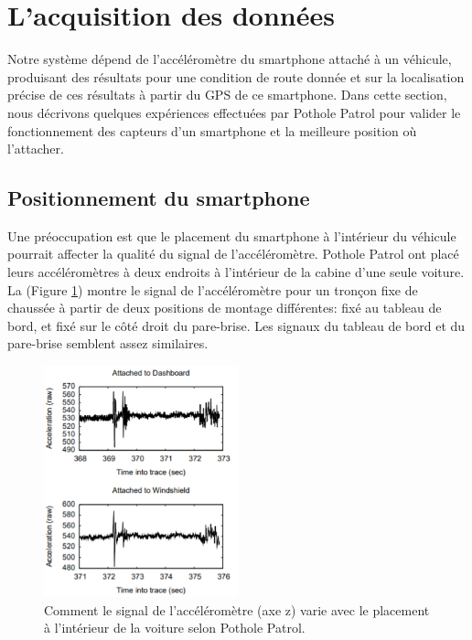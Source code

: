 

\newpage
\section{L'acquisition des données}
Notre système dépend de l'accéléromètre du smartphone attaché à un véhicule, produisant des résultats pour une condition de route donnée et sur la localisation précise de ces résultats à partir du GPS de ce smartphone.
Dans cette section, nous décrivons quelques expériences effectuées par Pothole Patrol \cite{PDFPotholePatrol} pour valider le fonctionnement des capteurs d'un smartphone et la meilleure position où l'attacher.

\subsection{Positionnement du smartphone}
Une préoccupation est que le placement du smartphone à l'intérieur du véhicule pourrait affecter la qualité du signal de l'accéléromètre. Pothole Patrol ont placé leurs accéléromètres à deux endroits à l'intérieur de la cabine d'une seule voiture. La (Figure \ref{fig:smartphonePosition}) montre le signal de l'accéléromètre pour un tronçon fixe de chaussée à partir de deux positions de montage différentes: fixé au tableau de bord, et fixé sur le côté droit du pare-brise. Les signaux du tableau de bord et du pare-brise semblent assez similaires. 

\begin{figure}[h!]
  \center
  \includegraphics[width=0.50\textwidth]{Images/chapter2/positionmnt.PNG}
  \caption{Comment le signal de l'accéléromètre (axe z) varie avec le placement à l'intérieur de la voiture selon Pothole Patrol.}
  \label{fig:smartphonePosition}
\end{figure}

